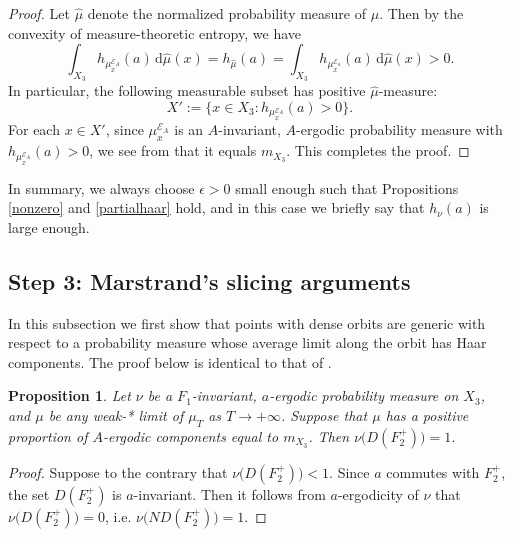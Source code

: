 \documentclass[reqno,12pt]{amsart}
\newtheorem{proposition}[theorem]{Proposition}
\theoremstyle{definition}
\numberwithin{equation}{section}
\newcommand{\E}{\mathscr{E}}
\newcommand {\comm}[1]   {\textcolor{red}{#1}}
\begin{document}
{\begin{proof}
    Let $\widehat{\mu}$ denote the normalized probability measure of $\mu$. Then by the convexity of measure-theoretic entropy, we have $$\int_{X_3}h_{\mu^{\E_A}_x}(a)\,\mathrm{d}\widehat{\mu}(x)=h_{\widehat{\mu}}(a)=\int_{X_3}h_{\mu^{\E_a}_x}(a)\,\mathrm{d}\widehat{\mu}(x)>0.$$
   In particular, the following measurable subset has positive $\widehat{\mu}$-measure: $$
    X':=\{x\in X_3:h_{\mu^{\E_A}_x}(a)>0\}.
    $$
    For each $x\in X'$, since $\mu^{\E_A}_x$ is an $A$-invariant, $A$-ergodic probability measure with $h_{\mu^{\E_A}_x}(a)>0$, we see from \cite[Corollary 1.4]{EKL06} that it equals $m_{X_3}$. This completes the proof.
\end{proof}

In summary, we always choose $\epsilon>0$ small enough such that Propositions \ref{nonzero} and \ref{partialhaar} hold, and in this case we briefly say that $h_{\nu}(a)$ is large enough.


\subsection{Step 3: Marstrand's slicing arguments}

In this subsection we first show that points with dense orbits are generic with respect to a probability measure whose average limit along the orbit has Haar components. The proof below is identical to that of \cite[Theorem 3.2]{bet15}.

\begin{proposition}\label{fulldense}
	Let $\nu$ be a $F_1$-invariant, $a$-ergodic probability measure on $X_3$, and $\mu$ be any weak-* limit of $\mu_T$ as $T\to +\infty$. Suppose that $\mu$ has a positive proportion of $A$-ergodic components equal to $m_{X_3}$. %
    Then $\nu\big(D(F_2^+)\big)=1$.
\end{proposition}
\begin{proof}
Suppose to the contrary that $\nu\big(D(F_2^+)\big)<1$. Since $a$ commutes with $F_2^+$, the set $D(F_2^+)$ is $a$-invariant. Then it follows from $a$-ergodicity of $\nu$ that $\nu\big(D(F_2^+)\big)=0$, i.e. $\nu\big(ND(F_2^+)\big)=1$.


\end{proof}}
\end{document}
